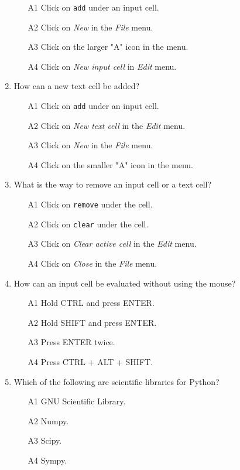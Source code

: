 \begin{enumerate}
\begin{enumerate}
\item[A1] Click on {\tt add} under an input cell. 
\item[A2] Click on {\em New} in the {\em File} menu.
\item[A3] Click on the larger "A" icon in the menu.
\item[A4] Click on {\em New input cell} in {\em Edit} menu.
\end{enumerate}
\item How can a new text cell be added?
\begin{enumerate}
\item[A1] Click on {\tt add} under an input cell. 
\item[A2] Click on {\em New text cell} in the {\em Edit} menu.
\item[A3] Click on {\em New} in the {\em File} menu.
\item[A4] Click on the smaller "A" icon in the menu.
\end{enumerate}
\item What is the way to remove an input cell or a text cell?
\begin{enumerate}
\item[A1] Click on {\tt remove} under the cell. 
\item[A2] Click on {\tt clear} under the cell. 
\item[A3] Click on {\em Clear active cell} in the {\em Edit} menu.
\item[A4] Click on {\em Close} in the {\em File} menu.
\end{enumerate}
\item How can an input cell be evaluated without using the mouse?
\begin{enumerate}
\item[A1] Hold CTRL and press ENTER.
\item[A2] Hold SHIFT and press ENTER.
\item[A3] Press ENTER twice.
\item[A4] Press CTRL + ALT + SHIFT.
\end{enumerate}
\item Which of the following are scientific libraries for Python?
\begin{enumerate}
\item[A1] GNU Scientific Library.
\item[A2] Numpy.
\item[A3] Scipy.
\item[A4] Sympy.
\end{enumerate}
\end{enumerate}

